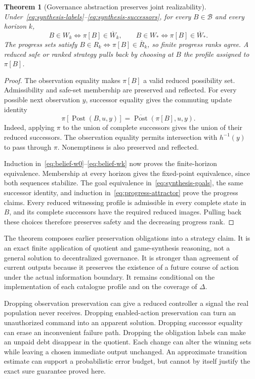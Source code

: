 \documentclass[11pt,letterpaper]{article}
\theoremstyle{plain}
\newtheorem{theorem}[proposition]{Theorem}
\theoremstyle{definition}
\theoremstyle{remark}
\begin{document}
\begin{theorem}[Governance abstraction preserves joint realizability]\label{thm:synthesis-transport}
Under~\eqref{eq:synthesis-labels}--\eqref{eq:synthesis-successors}, for every $B\in\mathcal B$ and every horizon $k$,
\[
B\in W_k\Longleftrightarrow\pi[B]\in\overline W_k,
\qquad
B\in W_*\Longleftrightarrow\pi[B]\in\overline W_*.
\]
The progress sets satisfy $B\in R_k\Longleftrightarrow\pi[B]\in\overline R_k$, so finite progress ranks agree. A reduced safe or ranked strategy pulls back by choosing at $B$ the profile assigned to $\pi[B]$.
\end{theorem}
\begin{proof}
The observation equality makes $\pi[B]$ a valid reduced possibility set. Admissibility and safe-set membership are preserved and reflected. For every possible next observation $y$, successor equality gives the commuting update identity
\begin{equation}\label{eq:synthesis-post-commute}
\pi[\operatorname{Post}(B,u,y)]
=\overline{\operatorname{Post}}(\pi[B],u,y).
\end{equation}
Indeed, applying $\pi$ to the union of complete successors gives the union of their reduced successors. The observation equality permits intersection with $h^{-1}(y)$ to pass through $\pi$. Nonemptiness is also preserved and reflected.

Induction in~\eqref{eq:belief-w0}--\eqref{eq:belief-wk} now proves the finite-horizon equivalence. Membership at every horizon gives the fixed-point equivalence, since both sequences stabilize. The goal equivalence in~\eqref{eq:synthesis-goals}, the same successor identity, and induction in~\eqref{eq:progress-attractor} prove the progress claims. Every reduced witnessing profile is admissible in every complete state in $B$, and its complete successors have the required reduced images. Pulling back these choices therefore preserves safety and the decreasing progress rank.
\end{proof}

The theorem composes earlier preservation obligations into a strategy claim. It is an exact finite application of quotient and game-synthesis reasoning, not a general solution to decentralized governance. It is stronger than agreement of current outputs because it preserves the existence of a future course of action under the actual information boundary. It remains conditional on the implementation of each catalogue profile and on the coverage of $\Delta$.

Dropping observation preservation can give a reduced controller a signal the real population never receives. Dropping enabled-action preservation can turn an unauthorized command into an apparent solution. Dropping successor equality can erase an inconvenient failure path. Dropping the obligation labels can make an unpaid debt disappear in the quotient. Each change can alter the winning sets while leaving a chosen immediate output unchanged. An approximate transition estimate can support a probabilistic error budget, but cannot by itself justify the exact sure guarantee proved here.
\end{document}

